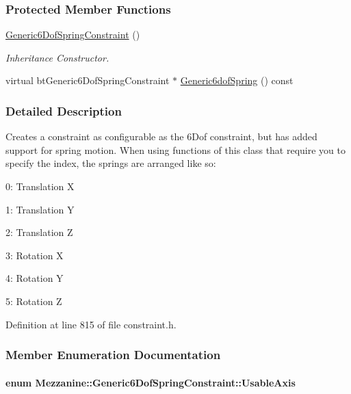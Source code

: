 \subsubsection*{Protected Member Functions}
\begin{DoxyCompactItemize}
\item 
\hyperlink{classMezzanine_1_1Generic6DofSpringConstraint_acd643a162aba9452cd10660a89d7acf7}{Generic6DofSpringConstraint} ()
\begin{DoxyCompactList}\small\item\em Inheritance Constructor. \item\end{DoxyCompactList}\item 
virtual btGeneric6DofSpringConstraint $\ast$ \hyperlink{classMezzanine_1_1Generic6DofSpringConstraint_ac57671613502a67f7b5135ba947f7e9d}{Generic6dofSpring} () const 
\end{DoxyCompactItemize}


\subsubsection{Detailed Description}
Creates a constraint as configurable as the 6Dof constraint, but has added support for spring motion. When using functions of this class that require you to specify the index, the springs are arranged like so: \par

\begin{DoxyItemize}
\item 0: Translation X
\item 1: Translation Y
\item 2: Translation Z
\item 3: Rotation X
\item 4: Rotation Y
\item 5: Rotation Z 
\end{DoxyItemize}

Definition at line 815 of file constraint.h.



\subsubsection{Member Enumeration Documentation}
\hypertarget{classMezzanine_1_1Generic6DofSpringConstraint_acdffbc070d80b5480bf1020d4a2351ed}{
\paragraph[{UsableAxis}]{\setlength{\rightskip}{0pt plus 5cm}enum {\bf Mezzanine::Generic6DofSpringConstraint::UsableAxis}}\hfill}
\label{classMezzanine_1_1Generic6DofSpringConstraint_acdffbc070d80b5480bf1020d4a2351ed}


